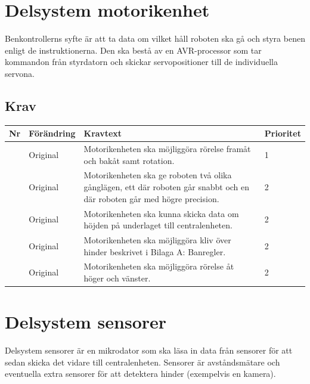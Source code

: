 \documentclass[a4paper,titlepage,12pt]{article}
\newcounter{reqNr}
\newcommand{\nextReqNr}{\stepcounter{reqNr}\arabic{reqNr}}
\begin{document}
	\section{Delsystem motorikenhet}
	Benkontrollerns syfte är att ta data om vilket håll roboten ska gå och styra benen enligt de
	instruktionerna. Den ska bestå av en AVR-processor som tar kommandon från styrdatorn och skickar
	servopositioner till de individuella servona.

	\subsection{Krav}
	\begin{table}[h]
		\label{tab:label}
		\begin{tabularx}{\textwidth}{|c|l|X|l|}
			\hline
			\textbf{Nr} & \textbf{Förändring} & \textbf{Kravtext} & \textbf{Prioritet} 
				\\ \hline

			\nextReqNr & Original & Motorikenheten ska möjliggöra rörelse framåt och 
				bakåt samt rotation. & 1
				\\ \hline

			\nextReqNr & Original & Motorikenheten ska ge roboten två olika gånglägen,
				ett där roboten går 
				snabbt och en där roboten går med högre precision.& 2
				\\ \hline

			\nextReqNr & Original & Motorikenheten ska kunna skicka data om höjden 
				på underlaget
  				till centralenheten. & 2
				\\ \hline

			\nextReqNr & Original & Motorikenheten ska möjliggöra kliv över hinder 
				beskrivet i Bilaga A:
  				Banregler. & 2
				\\ \hline

			\nextReqNr & Original & Motorikenheten ska möjliggöra rörelse åt höger 
				och vänster. & 2 
				\\\hline

		\end{tabularx}
	\end{table}


	\section{Delsystem sensorer}
	Delsystem sensorer är en mikrodator som ska läsa in data från sensorer för att sedan skicka 
	det vidare till centralenheten. Sensorer är avståndsmätare och eventuella extra sensorer 
	för att detektera hinder (exempelvis en kamera).
\end{document}

